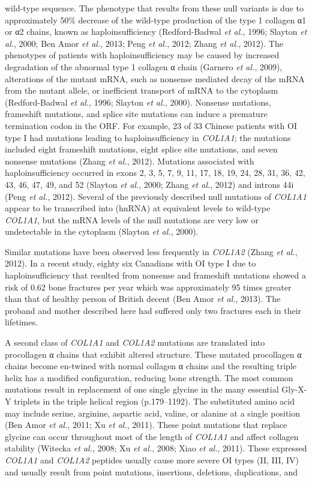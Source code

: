 wild-type sequence. The phenotype that results from these null variants is due to approximately 50\% decrease of the wild-type production of the type 1 collagen α1 or α2 chains, known as haploinsufficiency (Redford-Badwal \textit{et al.}, 1996; Slayton \textit{et al.}, 2000; Ben Amor \textit{et al.}, 2013; Peng \textit{et al.}, 2012; Zhang \textit{et al.}, 2012). The phenotypes of patients with haploinsufficiency may be caused by increased degradation of the abnormal type 1 collagen α chain (Garnero \textit{et al.}, 2009), alterations of the mutant mRNA, such as nonsense mediated decay of the mRNA from the mutant allele, or inefficient transport of mRNA to the cytoplasm (Redford-Badwal \textit{et al.}, 1996; Slayton \textit{et al.}, 2000). Nonsense mutations, frameshift mutations, and splice site mutations can induce a premature termination codon in the ORF. For example, 23 of 33 Chinese patients with OI type I had mutations leading to haploinsufficiency in \textit{COL1A1}; the mutations included eight frameshift mutations, eight splice site mutations, and seven nonsense mutations (Zhang \textit{et al.}, 2012). Mutations associated with haploinsufficiency occurred in exons 2, 3, 5, 7, 9, 11, 17, 18, 19, 24, 28, 31, 36, 42, 43, 46, 47, 49, and 52 (Slayton \textit{et al.}, 2000; Zhang \textit{et al.}, 2012) and introns 44i (Peng \textit{et al.}, 2012). Several of the previously described null mutations of \textit{COL1A1} appear to be transcribed into (hnRNA) at equivalent levels to wild-type \textit{COL1A1}, but the mRNA levels of the null mutations are very low or undetectable in the cytoplasm (Slayton \textit{et al.}, 2000).\par Similar mutations have been observed less frequently in \textit{COL1A2} (Zhang \textit{et al.}, 2012). In a recent study, eighty six Canadians with OI type I due to haploinsufficiency that resulted from nonsense and frameshift mutations showed a risk of 0.62 bone fractures per year which was approximately 95 times greater than that of healthy person of British decent (Ben Amor \textit{et al.}, 2013). The proband and mother described here had suffered only two fractures each in their lifetimes.\par A second class of \textit{COL1A1} and \textit{COL1A2} mutations are translated into procollagen α chains that exhibit altered structure. These mutated procollagen α chains become en-twined with normal collagen α chains and the resulting triple helix has a modified configuration, reducing bone strength. The most common mutations result in replacement of one single glycine in the many essential Gly-X-Y triplets in the triple helical region (p.179–1192). The substituted amino acid may include serine, arginine, aspartic acid, valine, or alanine at a single position (Ben Amor \textit{et al.}, 2011; Xu \textit{et al.}, 2011). These point mutations that replace glycine can occur throughout most of the length of \textit{COL1A1} and affect collagen stability (Witecka \textit{et al.}, 2008; Xu \textit{et al.}, 2008; Xiao \textit{et al.}, 2011). These expressed \textit{COL1A1} and \textit{COL1A2} peptides usually cause more severe OI types (II, III, IV) and usually result from point mutations, insertions, deletions, duplications, and 